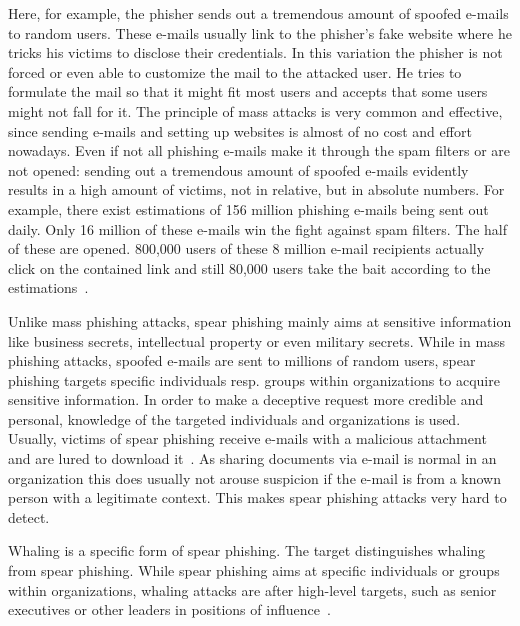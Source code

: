 \begin{description}[leftmargin=0cm]
	\item[Mass Phishing] Here, for example, the phisher sends out a tremendous amount of spoofed e-mails to random users.
 These e-mails usually link to the phisher's fake website where he tricks his victims to disclose their credentials.
 In this variation the phisher is not forced or even able to customize the mail to the attacked user.
 He tries to formulate the mail so that it might fit most users and accepts that some users might not fall for it.
 The principle of mass attacks is very common and effective, since sending e-mails and setting up websites is almost of no cost and effort nowadays.
 Even if not all phishing e-mails make it through the spam filters or are not opened: sending out a tremendous amount of spoofed e-mails evidently results in a high amount of victims, not in relative, but in absolute numbers.
 For example, there exist estimations of 156 million phishing e-mails being sent out daily.
 Only 16 million of these e-mails win the fight against spam filters.
 The half of these are opened.
 800,000 users of these 8 million e-mail recipients actually click on the contained link and still 80,000 users take the bait according to the estimations~\cite{takethebait}.  
	\item[Spear Phishing] Unlike mass phishing attacks, spear phishing mainly aims at sensitive information like business secrets, intellectual property or even military secrets.
 While in mass phishing attacks, spoofed e-mails are sent to millions of random users, spear phishing targets specific individuals resp.
 groups within organizations to acquire sensitive information.
 In order to make a deceptive request more credible and personal, knowledge of the targeted individuals and organizations is used.
 Usually, victims of spear phishing receive e-mails with a malicious attachment and are lured to download it~\cite{trendlabs2012spear}.
 As sharing documents via e-mail is normal in an organization this does usually not arouse suspicion if the e-mail is from a known person with a legitimate context.
 This makes spear phishing attacks very hard to detect\cite{trendlabs2012spear,statephishinghong}.
	\item[Whaling] Whaling is a specific form of spear phishing.
 The target distinguishes whaling from spear phishing.
 While spear phishing aims at specific individuals or groups within organizations, whaling attacks are after high-level targets, such as senior executives or other leaders in positions of influence~\cite{whaling}.

\end{description}

